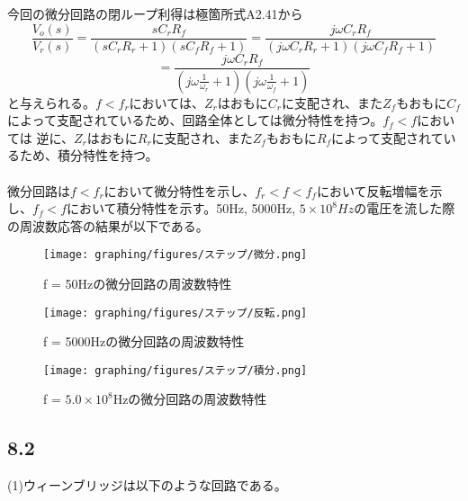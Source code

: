 \documentclass{ltjsarticle}
\begin{document}
今回の微分回路の閉ループ利得は極箇所式A2.41から
$$
\frac{V_o(s)}{V_r(s)} = \frac{sC_rR_f}{(sC_rR_r + 1)(sC_fR_f + 1)}
= \frac{j\omega C_rR_f}{(j\omega C_rR_r + 1)(j\omega C_fR_f + 1)}
$$
$$
= \frac{j\omega C_rR_f}{(j\omega \frac{1}{\omega_r}+1)(j\omega \frac{1}{\omega_f}+1)}
$$
と与えられる。$f<f_r$においては、$Z_r$はおもに$C_r$に支配され、また$Z_f$もおもに$C_f$によって支配されているため、回路全体としては微分特性を持つ。$f_f<f$においては
逆に、$Z_r$はおもに$R_r$に支配され、また$Z_f$もおもに$R_f$によって支配されているため、積分特性を持つ。\\
\\
微分回路は$f < f_r$において微分特性を示し、$f_r < f < f_f$において反転増幅を示し、$f_f < f$において積分特性を示す。50Hz, 5000Hz, $5\times10^8Hz$の電圧を流した際の周波数応答の結果が以下である。
\begin{figure}[H]
    \begin{center}
        \texttt{[image: graphing/figures/ステップ/微分.png]}
        \caption{f = 50Hzの微分回路の周波数特性}
    \end{center}
\end{figure}

\begin{figure}[H]
    \begin{center}
        \texttt{[image: graphing/figures/ステップ/反転.png]}
        \caption{f = 5000Hzの微分回路の周波数特性}
    \end{center}
\end{figure}

\begin{figure}[H]
    \begin{center}
        \texttt{[image: graphing/figures/ステップ/積分.png]}
        \caption{f = $5.0\times 10^8$Hzの微分回路の周波数特性}
    \end{center}
\end{figure}

\subsection*{8.2}
(1)ウィーンブリッジは以下のような回路である。
\end{document}
